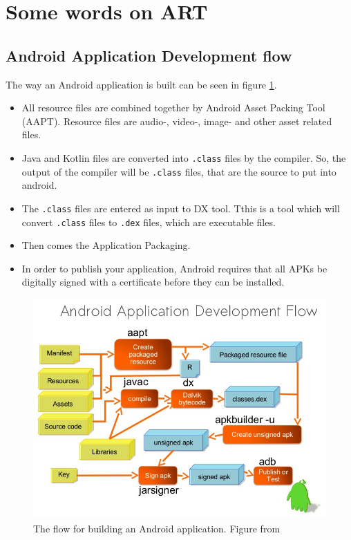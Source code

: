 \section{Some words on ART}
\subsection{Android Application Development flow}
The way an Android application is built can be seen in figure \ref{fig:develop}.

\begin{itemize}
	\item All resource files are combined together by Android Asset Packing Tool (AAPT). Resource files are  audio-, video-, image-  and other asset related files. 
	\item Java and Kotlin files are converted into \texttt{.class} files by the compiler. So, the output of the compiler will be \texttt{.class} files, that are the source to put into android. 	\item The \texttt{.class}  files are entered as input to DX tool. Tthis is a tool which will convert \texttt{.class} files to \texttt{.dex} files, which are  executable files. 
	\item Then comes the Application Packaging.	
	\item In order to publish your application, Android requires that all APKs be digitally signed with a certificate before they can be installed. 
\end{itemize}


\begin{figure}[hb]
	\includegraphics[width=\textwidth]{images/hello/development.jpg}
	\caption{The flow for building an Android application. Figure from \cite{Limbani2014}}
		\label{fig:develop}
\end{figure}


